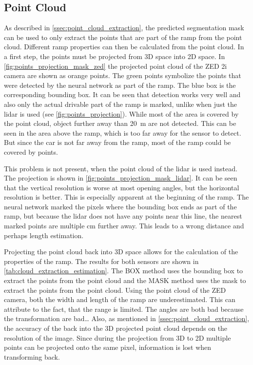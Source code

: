 \subsection{Point Cloud}
As described in \cref{ssec:point_cloud_extraction}, the predicted segmentation mask can be used to only extract the points that are part of the ramp from the point cloud.
Different ramp properties can then be calculated from the point cloud.
In a first step, the points must be projected from 3D space into 2D space.
In \cref{fig:points_projection_mask_zed} the projected point cloud of the ZED 2i camera are shown as orange points.
The green points symbolize the points that were detected by the neural network as part of the ramp.
The blue box is the corresponding bounding box.
It can be seen that detection works very well and also only the actual drivable part of the ramp is marked, unlike when just the \gls{lidar} is used (see \cref{fig:points_projection}).
While most of the area is covered by the point cloud, object further away than \SI{20}{\metre} are not detected.
This can be seen in the area above the ramp, which is too far away for the sensor to detect.
But since the car is not far away from the ramp, most of the ramp could be covered by points.\par
This problem is not present, when the point cloud of the \gls{lidar} is used instead.
The projection is shown in \cref{fig:points_projection_mask_lidar}.
It can be seen that the vertical resolution is worse at most opening angles, but the horizontal resolution is better.
This is especially apparent at the beginning of the ramp.
The neural network marked the pixels where the bounding box ends as part of the ramp, but because the \gls{lidar} does not have any points near this line, the nearest marked points are multiple \si{\cm} further away.
This leads to a wrong distance and perhaps length estimation.\par
Projecting the point cloud back into 3D space allows for the calculation of the properties of the ramp.
The results for both sensors are shown in \cref{tab:cloud_extraction_estimation}.
The BOX method uses the bounding box to extract the points from the point cloud and the MASK method uses the mask to extract the points from the point cloud.
Using the point cloud of the ZED camera, both the width and length of the ramp are underestimated.
This can attribute to the fact, that the range is limited.
The angles are both bad because the transformation are bad\dots
Also, as mentioned in \cref{ssec:point_cloud_extraction}, the accuracy of the back into the 3D projected point cloud depends on the resolution of the image.
Since during the projection from 3D to 2D multiple points can be projected onto the same pixel, information is lost when transforming back.

